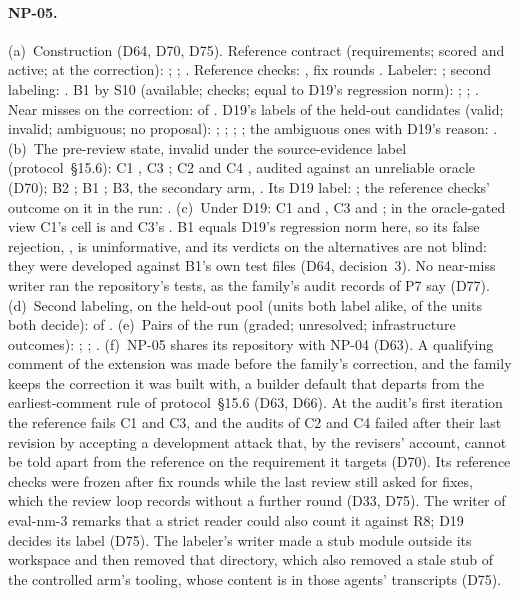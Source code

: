 \paragraph{NP-05.}
(a)~Construction (D64, D70, D75). Reference contract (requirements; scored and active; at the correction):
; ; . Reference checks:
, fix rounds . Labeler: ; second labeling:
. B1 by S10 (available; checks; equal to D19's regression norm): ;
; . Near misses on the correction:  of
. D19's labels of the held-out candidates (valid; invalid; ambiguous; no proposal):
; ; ; ; the ambiguous ones
with D19's reason: .
(b)~The pre-review state, invalid under the source-evidence label (protocol~\S15.6): C1 , C3
; C2  and C4 , audited against an unreliable oracle (D70); B2
; B1 ; B3, the secondary arm, . Its D19 label: ; the
reference checks' outcome on it in the run: .
(c)~Under D19: C1  and , C3  and ; in the oracle-gated
view C1's cell is  and C3's . B1 equals D19's regression norm here, so its false
rejection, , is uninformative, and its verdicts on the alternatives are not blind: they were developed
against B1's own test files (D64, decision~3). No near-miss writer ran the repository's tests, as the family's audit
records of P7 say (D77).
(d)~Second labeling, on the held-out pool (units both label alike, of the units both decide): 
of .
(e)~Pairs of the run (graded; unresolved; infrastructure outcomes): ; ;
.
(f)~NP-05 shares its repository with NP-04 (D63). A qualifying comment of the extension was made before the family's
correction, and the family keeps the correction it was built with, a builder default that departs from the
earliest-comment rule of protocol~\S15.6 (D63, D66). At the audit's first iteration the
reference fails C1 and C3, and the audits of C2 and C4 failed after their last revision by accepting a development
attack that, by the revisers' account, cannot be told apart from the reference on the requirement it targets (D70). Its
reference checks were frozen after  fix rounds while the last review still asked for fixes,
which the review loop records without a further round (D33, D75). The writer of eval-nm-3 remarks that a strict reader
could also count it against R8; D19 decides its label (D75). The labeler's writer made a stub module outside its
workspace and then removed that directory, which also removed a stale stub of the controlled arm's tooling, whose
content is in those agents' transcripts (D75).

